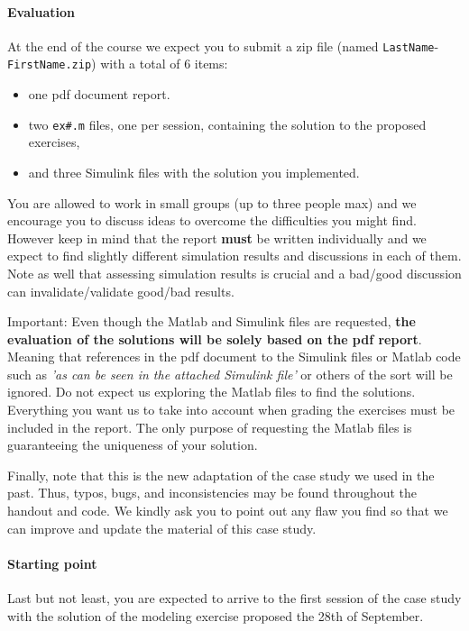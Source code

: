 	\paragraph{Evaluation}
	At the end of the course we expect you to submit a zip file (named \texttt{LastName}-\texttt{FirstName.zip}) with a total of 6 items:
	\begin{itemize}
		\setlength\itemsep{0em}
		\item one pdf document report. 
		\item two \texttt{ex\#.m} files, one per session, containing the solution to the proposed exercises,
		\item and three Simulink files with the solution you implemented.
	\end{itemize}

	You are allowed to work in small groups (up to three people max) and we encourage you to discuss ideas to overcome the difficulties you might find.
	However keep in mind that the report \textbf{must} be written individually and we expect to find slightly different simulation results and discussions in each of them. 
	Note as well that assessing simulation results is crucial and a bad/good discussion can invalidate/validate good/bad results. 	
	\par
	Important: Even though the Matlab and Simulink files are requested, \textbf{the evaluation of the solutions will be solely based on the pdf report}.
	Meaning that references in the pdf document to the Simulink files or Matlab code such as \emph{'as can be seen in the attached Simulink file'} or others of the sort will be ignored. 
	Do not expect us exploring the Matlab files to find the solutions.
	Everything you want us to take into account when grading the exercises must be included in the report. 
	The only purpose of requesting the Matlab files is guaranteeing the uniqueness of your solution.\par
	Finally, note that this is the new adaptation of the case study we used in the past. 
	Thus, typos, bugs, and inconsistencies may be found throughout the handout and code.
	We kindly ask you to point out any flaw you find so that we can improve and update the material of this case study.

	\paragraph{Starting point}
	Last but not least, you are expected to arrive to the first session of the case study with the solution of the modeling exercise proposed the 28th of September. 

